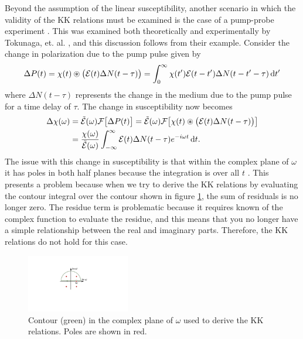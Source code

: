Beyond the assumption of the linear susceptibility, another scenario in which the validity of the KK relations must be examined is the case of a pump-probe experiment \cite{tokunagaFemtosecondTimeresolvedDispersion1993, tokunagaFemtosecondContinuumInterferometer1996, lucariniKramersKronigRelationsOptical2005}.  This was examined both theoretically and experimentally by Tokunaga, et. al. \cite{tokunagaFemtosecondTimeresolvedDispersion1993, tokunagaFemtosecondContinuumInterferometer1996}, and this discussion follows from their example.  Consider the change in polarization due to the pump pulse given by
\begin{equation}
	\Delta P(t) = \chi(t)\circledast \big( \mathcal{E}(t) \Delta N(t-\tau)\big) = \int_{0}^{\infty}\chi(t')\mathcal{E}(t-t')\Delta N(t - t' - \tau) \mathop{}\!\mathrm{d} t'
\end{equation}
where $\Delta N (t-\tau)$ represents the change in the medium due to the pump pulse for a time delay of $\tau$.  The change in susceptibility now becomes
\begin{equation}
	\label{eqn:d_chi}
	\begin{aligned}
		\Delta\chi(\omega) &= \tilde{\mathcal{E}}(\omega) \mathcal{F}\big[\Delta P(t)\big] = \tilde{\mathcal{E}}(\omega) \mathcal{F}\big[ \chi(t)\circledast \big( \mathcal{E}(t) \Delta N(t-\tau)\big) \big]\\
		& = \frac{\chi(\omega)}{\tilde{\mathcal{E}}(\omega)}\int_{-\infty}^{\infty}\mathcal{E}(t)\Delta N (t-\tau) e^{-i\omega t }\mathop{}\!\mathrm{d} t.
	\end{aligned}
\end{equation}
The issue with this change in susceptibility is that within the complex plane of $\omega$ it has poles in both half planes because the integration is over all $t$ \cite{tokunagaFemtosecondTimeresolvedDispersion1993, tokunagaFemtosecondContinuumInterferometer1996, lucariniKramersKronigRelationsOptical2005}.  This presents a problem because when we try to derive the KK relations by evaluating the contour integral over the contour shown in figure \ref{fig:KK_contour_pump}, the sum of residuals is no longer zero.  The residue term is problematic because it requires known of the complex function to evaluate the residue, and this means that you no longer have a simple relationship between the real and imaginary parts.  Therefore, the KK relations do not hold for this case.

\begin{figure}
	\centering
	\includegraphics[width=0.4\textwidth]{figures/CATS/KK_pump.pdf}
	\caption[Contour used to derive KK relations in the presence of a pump field]{Contour (green) in the complex plane of $\omega$ used to derive the KK relations.  Poles are shown in red.}
	\label{fig:KK_contour_pump}
\end{figure}

